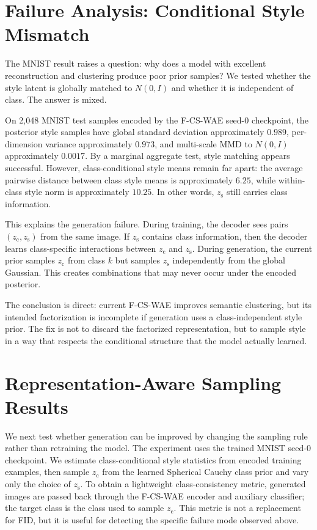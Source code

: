 \documentclass[10pt]{article}
\newcommand{\ours}{F-CS-WAE}
\newcommand{\zc}{z_{\mathrm{c}}}
\newcommand{\zs}{z_{\mathrm{s}}}
\begin{document}
\section{Failure Analysis: Conditional Style Mismatch}
\label{sec:failure}

The MNIST result raises a question: why does a model with excellent reconstruction and clustering produce poor prior samples? We tested whether the style latent is globally matched to $N(0,I)$ and whether it is independent of class. The answer is mixed.

On 2,048 MNIST test samples encoded by the \ours{} seed-0 checkpoint, the posterior style samples have global standard deviation approximately $0.989$, per-dimension variance approximately $0.973$, and multi-scale MMD to $N(0,I)$ approximately $0.0017$. By a marginal aggregate test, style matching appears successful. However, class-conditional style means remain far apart: the average pairwise distance between class style means is approximately $6.25$, while within-class style norm is approximately $10.25$. In other words, $\zs$ still carries class information.

This explains the generation failure. During training, the decoder sees pairs $(\zc,\zs)$ from the same image. If $\zs$ contains class information, then the decoder learns class-specific interactions between $\zc$ and $\zs$. During generation, the current prior samples $\zc$ from class $k$ but samples $\zs$ independently from the global Gaussian. This creates combinations that may never occur under the encoded posterior.

The conclusion is direct: current \ours{} improves semantic clustering, but its intended factorization is incomplete if generation uses a class-independent style prior. The fix is not to discard the factorized representation, but to sample style in a way that respects the conditional structure that the model actually learned.

\section{Representation-Aware Sampling Results}
\label{sec:sampling-results}

We next test whether generation can be improved by changing the sampling rule rather than retraining the model. The experiment uses the trained MNIST seed-0 checkpoint. We estimate class-conditional style statistics from encoded training examples, then sample $\zc$ from the learned Spherical Cauchy class prior and vary only the choice of $\zs$. To obtain a lightweight class-consistency metric, generated images are passed back through the \ours{} encoder and auxiliary classifier; the target class is the class used to sample $\zc$. This metric is not a replacement for FID, but it is useful for detecting the specific failure mode observed above.
\end{document}
